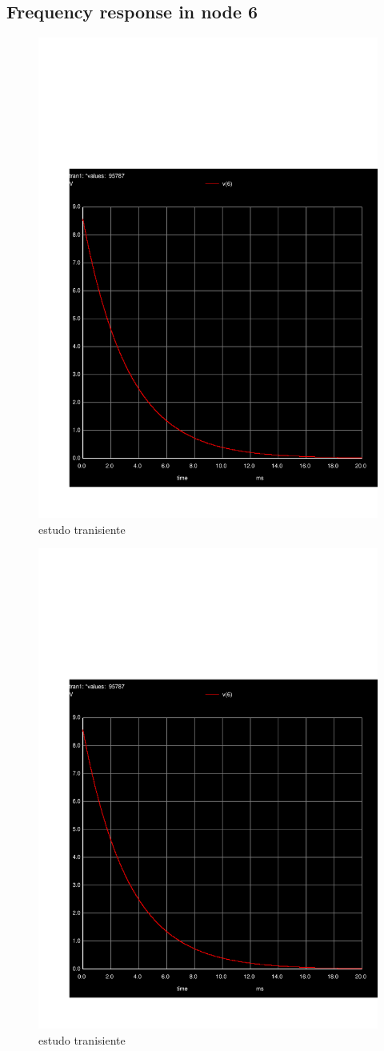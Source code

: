 \pagebreak
\subsection{ Frequency response in node 6}
\begin{figure}[h] \centering
\includegraphics[width=0.6\linewidth]{trans.pdf}
\caption{estudo tranisiente}
\label{fig:transient}
\end{figure}


\begin{figure}[h] \centering
\includegraphics[width=0.6\linewidth]{trans.pdf}
\caption{estudo tranisiente}
\label{fig:transient}
\end{figure}
